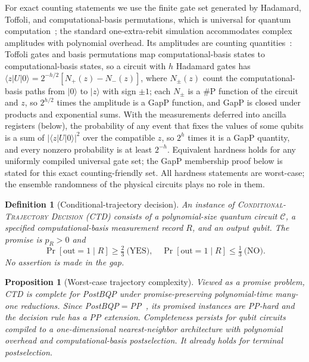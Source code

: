 \documentclass[aps,prx,reprint,superscriptaddress,nobibnotes,longbibliography]{revtex4-2}
\newtheorem{proposition}{Proposition}
\newtheorem{definition}{Definition}
\theoremstyle{remark}
\begin{document}
For exact counting statements we use the finite gate set generated by Hadamard, Toffoli, and computational-basis permutations, which is universal for quantum computation~\cite{Shi2003,Aharonov2003}; the standard one-extra-rebit simulation accommodates complex amplitudes with polynomial overhead.  Its amplitudes are counting quantities~\cite{Fenner1994}: Toffoli gates and basis permutations map computational-basis states to computational-basis states, so a circuit with $h$ Hadamard gates has $\langle z|U|0\rangle=2^{-h/2}[N_+(z)-N_-(z)]$, where $N_\pm(z)$ count the computational-basis paths from $|0\rangle$ to $|z\rangle$ with sign $\pm1$; each $N_\pm$ is a $\#$P function of the circuit and $z$, so $2^{h/2}$ times the amplitude is a GapP function, and GapP is closed under products and exponential sums.  With the measurements deferred into ancilla registers (below), the probability of any event that fixes the values of some qubits is a sum of $|\langle z|U|0\rangle|^2$ over the compatible $z$, so $2^h$ times it is a GapP quantity, and every nonzero probability is at least $2^{-h}$.  Equivalent hardness holds for any uniformly compiled universal gate set; the GapP membership proof below is stated for this exact counting-friendly set.  All hardness statements are worst-case; the ensemble randomness of the physical circuits plays no role in them.

\begin{definition}[Conditional-trajectory decision]
An instance of \textsc{Conditional-Trajectory Decision} (CTD) consists of a polynomial-size quantum circuit $\mathcal C$, a specified computational-basis measurement record $R$, and an output qubit.  The promise is $p_R>0$ and
\begin{equation}
 \Pr[\mathrm{out}=1\mid R]\ge\tfrac23\ \text{(YES)},\quad
 \Pr[\mathrm{out}=1\mid R]\le\tfrac13\ \text{(NO)}.
\end{equation}
No assertion is made in the gap.
\end{definition}

\begin{proposition}[Worst-case trajectory complexity]
\label{thm:complexity}
Viewed as a promise problem, CTD is complete for PostBQP under promise-preserving polynomial-time many-one reductions.  Since PostBQP$=$PP~\cite{Aaronson2005}, its promised instances are PP-hard and the decision rule has a PP extension.  Completeness persists for qubit circuits compiled to a one-dimensional nearest-neighbor architecture with polynomial overhead and computational-basis postselection.  It already holds for terminal postselection.
\end{proposition}
\end{document}
